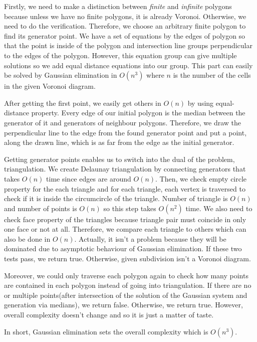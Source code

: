 Firstly, we need to make a distinction between \textit{finite} and \textit{infinite} polygons because unless we have no finite polygons, it is already Voronoi. Otherwise, we need to do the verification. Therefore, we choose an arbitrary finite polygon to find its generator point. We have a set of equations by the edges of polygon so that the point is inside of the polygon and intersection line groups perpendicular to the edges of the polygon. However, this equation group can give multiple solutions so we add equal distance equations into our group. This part can easily be solved by Gaussian elimination in $O(n^3)$ where $n$ is the number of the cells in the given Voronoi diagram.

After getting the first point, we easily get others in $O(n)$ by using equal-distance property. Every edge of our initial polygon is the median between the generator of it and generators of neighbour polygons. Therefore, we draw the perpendicular line to the edge from the found generator point and put a point, along the drawn line, which is as far from the edge as the initial generator.

Getting generator points enables us to switch into the dual of the problem, triangulation. We create Delaunay triangulation by connecting generators that takes $O(n)$ time since edges are around $O(n)$. Then, we check empty circle property for the each triangle and for each triangle, each vertex is traversed to check if it is inside the circumcircle of the triangle. Number of triangle is $O(n)$ and number of points is $O(n)$ so this step takes $O(n^2)$ time. We also need to check face property of the triangles because triangle pair must coincide in only one face or not at all. Therefore, we compare each triangle to others which can also be done in $O(n)$. Actually, it isn't a problem because they will be dominated due to asymptotic behaviour of Gaussian elimination. If these two tests pass, we return true. Otherwise, given subdivision isn't a Voronoi diagram.

Moreover, we could only traverse each polygon again to check how many points are contained in each polygon instead of going into triangulation. If there are no or multiple points(after intersection of the solution of the Gaussian system and generation via medians), we return false. Otherwise, we return true. However, overall complexity doesn't change and so it is just a matter of taste.

In short, Gaussian elimination sets the overall complexity which is $O(n^3)$.